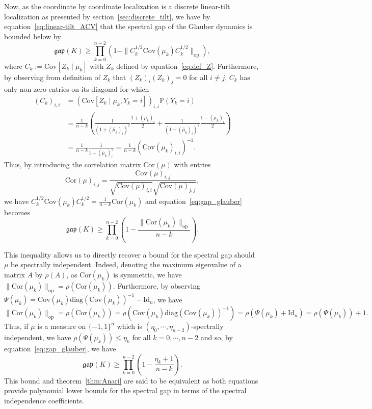Now, as the coordinate by coordinate localization is a discrete linear-tilt localization as presented 
by section~\ref{sec:discrete_tilt}, we have by equation~\eqref{eq:linear-tilt_ACV} that the spectral gap of 
the Glauber dynamics is bounded below by
\begin{equation}\label{eq:gap_glauber}
  \mathfrak{gap}(K) \ge \prod_{k = 0}^{n - 2} (1 - \|C_k^{1 / 2} \text{Cov}(\mu_k) C_k^{1 / 2}\|_{\text{op}}),
\end{equation}
where \(C_k := \text{Cov}[Z_k \mid \mu_k]\) with \(Z_k\) defined by equation~\eqref{eq:def_Z}. Furthermore, 
by observing from definition of \(Z_k\) that \((Z_k)_i (Z_k)_j = 0\) for all \(i \neq j\), 
\(C_k\) has only non-zero entries on its diagonal for which 
\begin{align*}
  (C_k)_{i, i} &= (\text{Cov}[Z_k \mid \mu_k, Y_k = i])_{i, i} \mathbb{P}(Y_k = i)\\
  & = \frac{1}{n - k}\left(\frac{1}{(1 + (\bar{\mu}_k)_i)^2}\frac{1 + (\bar{\mu}_k)_i}{2} + 
    \frac{1}{(1 - (\bar{\mu}_k)_i)^2}\frac{1 - (\bar{\mu}_k)_i}{2}\right)\\
  & = \frac{1}{n - k}\frac{1}{1 - (\bar{\mu}_k)_i^2} 
    = \frac{1}{n - k}(\text{Cov}(\mu_k)_{i, i})^{-1}.
\end{align*}
Thus, by introducing the correlation matrix \(\text{Cor}(\mu)\) with entries 
\[\text{Cor}(\mu)_{i, j} = \frac{\text{Cov}(\mu)_{i, j}}{\sqrt{\text{Cov}(\mu)_{i, i}}\sqrt{\text{Cov}(\mu)_{j, j}}},\]
we have \(C_k^{1 / 2} \text{Cov}(\mu_k) C_k^{1 / 2} = \frac{1}{n - k}\text{Cor}(\mu_k)\) and 
equation~\eqref{eq:gap_glauber} becomes
\begin{equation}
  \mathfrak{gap}(K) \ge \prod_{k = 0}^{n - 2} \left(1 - \frac{\|\text{Cor}(\mu_k)\|_{\text{op}}}{n - k}\right).
\end{equation}

This inequality allows us to directly recover a bound for the spectral gap should \(\mu\) be spectrally 
independent. Indeed, denoting the maximum eigenvalue of a matrix \(A\) by \(\rho(A)\), as \(\text{Cor}(\mu_k)\) is symmetric, we 
have \(\|\text{Cor}(\mu_k)\|_{\text{op}} = \rho(\text{Cor}(\mu_k))\). Furthermore, by observing 
\(\Psi(\mu_k) = \text{Cov}(\mu_k) \text{diag}(\text{Cov}(\mu_k))^{-1} - \text{Id}_n\), we have 
\[\|\text{Cor}(\mu_k)\|_{\text{op}} = \rho(\text{Cor}(\mu_k)) = \rho(\text{Cov}(\mu_k) \text{diag}(\text{Cov}(\mu_k))^{-1})
  = \rho(\Psi(\mu_k) + \text{Id}_n) = \rho(\Psi(\mu_k)) + 1.\]
Thus, if \(\mu\) is a measure on \(\{-1, 1\}^n\) which is \((\eta_0, \cdots, \eta_{n - 2})\)-spectrally 
independent, we have \(\rho(\Psi(\mu_k)) \le \eta_k\) for all \(k = 0, \cdots, n - 2\) and so, by 
equation~\eqref{eq:gap_glauber}, we have
\begin{equation}\label{eq:gap_glauber_final}
  \mathfrak{gap}(K) \ge \prod_{k = 0}^{n - 2}\left(1 - \frac{\eta_k + 1}{n - k}\right).
\end{equation}
This bound and theorem~\ref{thm:Anari} are said to be equivalent as both equations provide polynomial 
lower bounds for the spectral gap in terms of the spectral independence coefficients.

